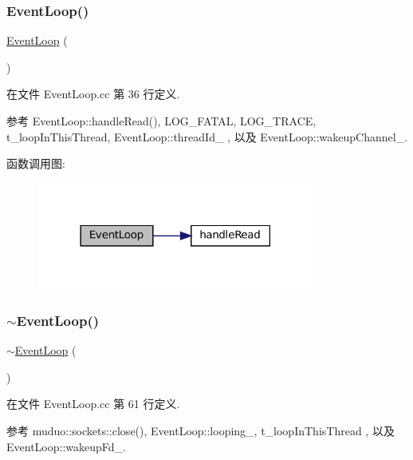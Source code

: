 \subsubsection{\texorpdfstring{Event\+Loop()}{EventLoop()}}
{\footnotesize\ttfamily \hyperlink{classmuduo_1_1EventLoop}{Event\+Loop} (\begin{DoxyParamCaption}{ }\end{DoxyParamCaption})}



在文件 Event\+Loop.\+cc 第 36 行定义.



参考 Event\+Loop\+::handle\+Read(), L\+O\+G\+\_\+\+F\+A\+T\+AL, L\+O\+G\+\_\+\+T\+R\+A\+CE, t\+\_\+loop\+In\+This\+Thread, Event\+Loop\+::thread\+Id\+\_\+ , 以及 Event\+Loop\+::wakeup\+Channel\+\_\+.

函数调用图\+:
\nopagebreak
\begin{figure}[H]
\begin{center}
\leavevmode
\includegraphics[width=258pt]{classmuduo_1_1EventLoop_a2bb4ef53c2b77f2313fe0db9fc952450_cgraph}
\end{center}
\end{figure}
\mbox{\label{classmuduo_1_1EventLoop_ad39d140230e71b90198d0ed03e0c21f2}} 
\subsubsection{\texorpdfstring{$\sim$\+Event\+Loop()}{~EventLoop()}}
{\footnotesize\ttfamily $\sim$\hyperlink{classmuduo_1_1EventLoop}{Event\+Loop} (\begin{DoxyParamCaption}{ }\end{DoxyParamCaption})}



在文件 Event\+Loop.\+cc 第 61 行定义.



参考 muduo\+::sockets\+::close(), Event\+Loop\+::looping\+\_\+, t\+\_\+loop\+In\+This\+Thread , 以及 Event\+Loop\+::wakeup\+Fd\+\_\+.

